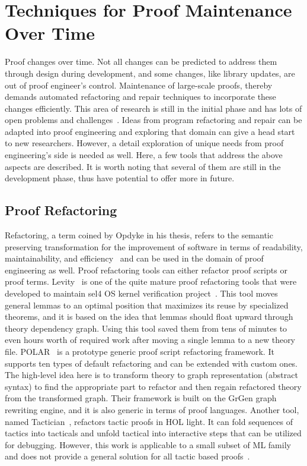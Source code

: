 \section{Techniques for Proof Maintenance Over Time}
\label{sec:maintenance}

Proof changes over time. Not all changes can be predicted to address them through design during development, and some changes, like library updates, are out of proof engineer's control. Maintenance of large-scale proofs, thereby demands automated refactoring and repair techniques to incorporate these changes efficiently. This area of research is still in the initial phase and has lots of open problems and challenges~\cite{Robert_2018}. Ideas from program refactoring and repair can be adapted into proof engineering and exploring that domain can give a head start to new researchers. However, a detail exploration of unique needs from proof engineering's side is needed as well. Here, a few tools that address the above aspects are described. It is worth noting that several of them are still in the development phase, thus have potential to offer more in future.

\subsection{Proof Refactoring} Refactoring, a term coined by Opdyke in his thesis, refers to the semantic preserving transformation for the improvement of software in terms of readability, maintainability, and efficiency~\cite{Opdyke_1992} and can be used in the domain of proof engineering as well. Proof refactoring tools can either refactor proof scripts or proof terms. Levity~\cite{Bourke_et_al_2012} is one of the quite mature proof refactoring tools that were developed to maintain sel4 OS kernel verification project~\cite{Klein_et_al_2014}. This tool moves general lemmas to an optimal position that maximizes its reuse by specialized theorems, and it is based on the idea that lemmas should float upward through theory dependency graph. Using this tool saved them from tens of minutes to even hours worth of required work after moving a single lemma to a new theory file. POLAR~\cite{Dietrich_et_al_2013} is a prototype generic proof script refactoring framework. It supports ten types of default refactoring and can be extended with custom ones. The high-level idea here is to transform theory to graph representation (abstract syntax) to find the appropriate part to refactor and then regain refactored theory from the transformed graph. Their framework is built on the GrGen graph rewriting engine, and it is also generic in terms of proof languages. Another tool, named Tactician~\cite{Adams_2015}, refactors tactic proofs in HOL light. It can fold sequences of tactics into tacticals and unfold tactical into interactive steps that can be utilized for debugging. However, this work is applicable to a small subset of ML family and does not provide a general solution for all tactic based proofs~\cite{Lin_et_al_2016}. 

